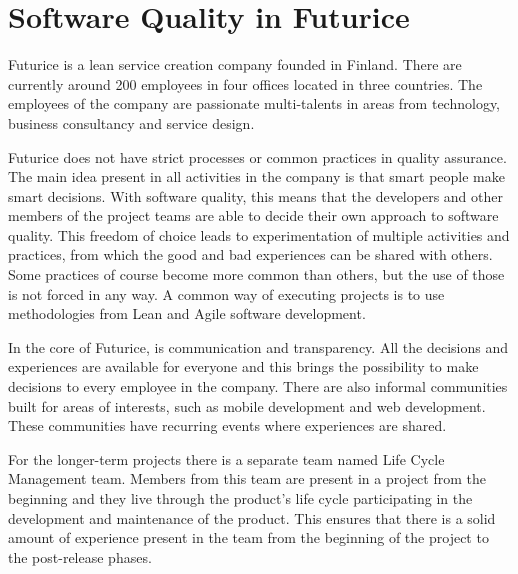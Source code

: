
 \section{Software Quality in Futurice}
\label{sec:quality_futurice}

Futurice is a lean service creation company founded in Finland. There are currently around 200 employees in four offices located in three countries. The employees of the company are passionate multi-talents in areas from technology, business consultancy and service design.~\cite{futuricefact}

Futurice does not have strict processes or common practices in quality assurance. The main idea present in all activities in the company is that smart people make smart decisions. With software quality, this means that the developers and other members of the project teams are able to decide their own approach to software quality. This freedom of choice leads to experimentation of multiple activities and practices, from which the good and bad experiences can be shared with others. Some practices of course become more common than others, but the use of those is not forced in any way. A common way of executing projects is to use methodologies from Lean and Agile software development.

In the core of Futurice, is communication and transparency. All the decisions and experiences are available for everyone and this brings the possibility to make decisions to every employee in the company. There are also informal communities built for areas of interests, such as mobile development and web development. These communities have recurring events where experiences are shared.

For the longer-term projects there is a separate team named Life Cycle Management team. Members from this team are present in a project from the beginning and they live through the product's life cycle participating in the development and maintenance of the product. This ensures that there is a solid amount of experience present in the team from the beginning of the project to the post-release phases.
